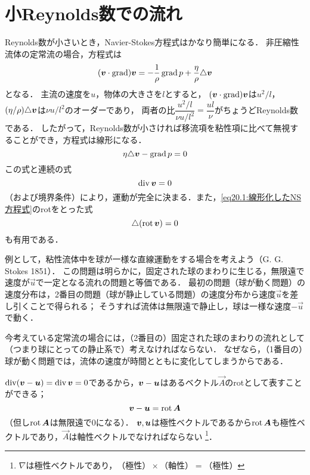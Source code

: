 \section{\spade 小Reynolds数での流れ}
Reynolds数が小さいとき，Navier-Stokes方程式はかなり簡単になる．
非圧縮性流体の定常流の場合，方程式は
\[
    (\vb*{v}\cdot\operatorname{grad})\vb*{v} = - \frac{1}{\rho} \operatorname{grad} p + \frac{\eta}{\rho} \triangle \vb*{v}
\]
となる．
主流の速度を$u$，物体の大きさを$l$とすると，
$(\vb*{v}\cdot\operatorname{grad})\vb*{v}$は$u^2/l$，
$(\eta/\rho)\triangle\vb*{v}$は$\nu u/l^2$のオーダーであり，
両者の比$\dfrac{u^2/l}{\nu u/l^2} = \dfrac{ul}{\nu}$がちょうどReynolds数である．
したがって，Reynolds数が小さければ移流項を粘性項に比べて無視することができ，方程式は線形になる．
\begin{equation}\label{eq20.1:線形化したNS方程式}
    \eta \triangle\vb*{v} - \operatorname{grad} p = 0
\end{equation}
この式と連続の式
\begin{equation}\label{eq20.2:連続の式（Stokes流）}
    \operatorname{div}\vb*{v}=0
\end{equation}
（および境界条件）により，運動が完全に決まる．また，\eqref{eq20.1:線形化したNS方程式}のrotをとった式
\begin{equation}\label{eq20.3:rotvに対するLaplace方程式}
    \triangle (\operatorname{rot}\vb*{v}) = 0
\end{equation}
も有用である．


例として，粘性流体中を球が一様な直線運動をする場合を考えよう（G. G. Stokes 1851）．
この問題は明らかに，固定された球のまわりに生じる，無限遠で速度が$\vec{u}$で一定となる流れの問題と等価である．
最初の問題（球が動く問題）の速度分布は，2番目の問題（球が静止している問題）の速度分布から速度$\vec{u}$を差し引くことで得られる；
そうすれば流体は無限遠で静止し，球は一様な速度$-\vec{u}$で動く．

今考えている定常流の場合には，（2番目の）固定された球のまわりの流れとして（つまり球にとっての静止系で）考えなければならない．
なぜなら，（1番目の）球が動く問題では，流体の速度が時間とともに変化してしまうからである．


$\operatorname{div}(\vb*{v}-\vb*{u})=\operatorname{div}\vb*{v}=0$であるから，$\vb*{v}-\vb*{u}$はあるベクトル$\vec{A}$のrotとして表すことができる；
\[
    \vb*{v} - \vb*{u} = \operatorname{rot}\vb*{A}
\]
（但し$\operatorname{rot}\vb*{A}$は無限遠で0になる）．
$\vb*{v}, \vb*{u}$は極性ベクトルであるから$\operatorname{rot}\vb*{A}$も極性ベクトルであり，$\vec{A}$は軸性ベクトルでなければならない
\footnote{$\nabla$は極性ベクトルであり，$\text{（極性）}\times\text{（軸性）}=\text{（極性）}$}．

